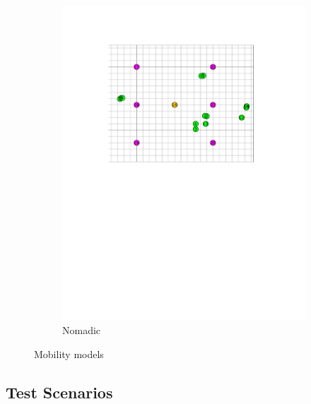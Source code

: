 \documentclass[conference]{IEEEtran}
\begin{document}
\begin{figure}
\begin{subfigure}[b]{0.22\textwidth}
        \includegraphics[trim= 100 350 100 90, clip, width=\textwidth]{RPGM_Model.pdf}
        \caption{Nomadic}
        \label{fig:nomadic}
    \end{subfigure} \caption{Mobility models}\label{fig:mobility_models}
\end{figure}

\subsection{Test Scenarios}
\end{document}
